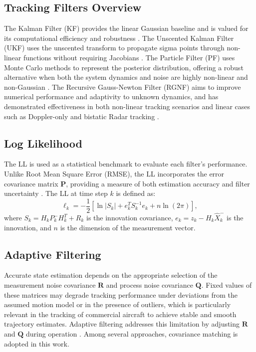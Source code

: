 \documentclass[conference]{IEEEtran}
\begin{document}
\subsection{Tracking Filters Overview}

The Kalman Filter (KF) provides the linear Gaussian baseline and is valued for its computational efficiency and robustness \cite{Julier1997a}. The Unscented Kalman Filter (UKF) uses the unscented transform to propagate sigma points through non-linear functions without requiring Jacobians \cite{Julier1997a}. The Particle Filter (PF) uses Monte Carlo methods to represent the posterior distribution, offering a robust alternative when both the system dynamics and noise are highly non-linear and non-Gaussian \cite{Arulampalam2007, NJGordon}. The Recursive Gauss-Newton Filter (RGNF) aims to improve numerical performance and adaptivity to unknown dynamics, and has demonstrated effectiveness in both non-linear tracking scenarios and linear cases such as Doppler-only and bistatic Radar tracking \cite{Inggs1, De2015, roaldje}.

\subsection{Log Likelihood}

The LL is used as a statistical benchmark to evaluate each filter's performance. Unlike Root Mean Square Error (RMSE), the LL incorporates the error covariance matrix $\mathbf{P}$, providing a measure of both estimation accuracy and filter uncertainty \cite{labbe2014kalman, Grewal2006}. The LL at time step $k$ is defined as:
\begin{equation}
  \ell_k = -\frac{1}{2}\left[\ln|S_k| + e_k^T S_k^{-1} e_k + n\ln(2\pi)\right],
\end{equation}
where $S_k = H_k P_k^- H_k^T + R_k$ is the innovation covariance, $e_k = z_k - H_k \hat{X}_k^-$ is the innovation, and $n$ is the dimension of the measurement vector.

\subsection{Adaptive Filtering}

Accurate state estimation depends on the appropriate selection of the measurement noise covariance $\mathbf{R}$ and process noise covariance $\mathbf{Q}$. Fixed values of these matrices may degrade tracking performance under deviations from the assumed motion model or in the presence of outliers, which is particularly relevant in the tracking of commercial aircraft to achieve stable and smooth trajectory estimates. Adaptive filtering addresses this limitation by adjusting $\mathbf{R}$ and $\mathbf{Q}$ during operation \cite{Mehra1972}. Among several approaches, covariance matching is adopted in this work.
\end{document}
